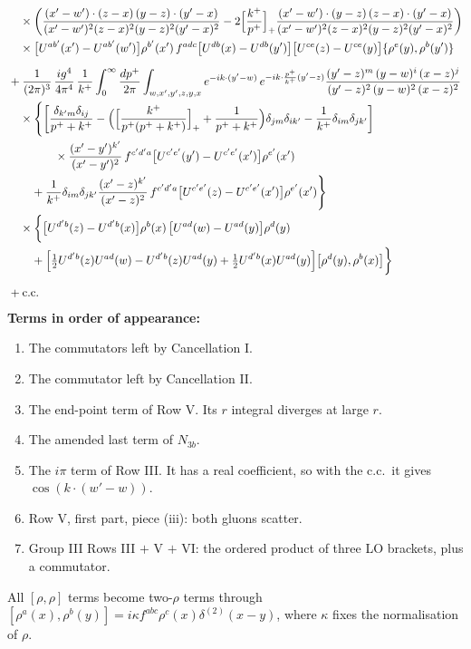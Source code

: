 \documentclass[9pt]{article}
\numberwithin{equation}{section}
\begin{document}
\begin{align}
&\quad\times\bigg(\frac{(x'-w')\cdot(z-x)\,(y-z)\cdot(y'-x)}{(x'-w')^{2}(z-x)^{2}(y-z)^{2}(y'-x)^{2}}-2\Big[\frac{k^{+}}{p^{+}}\Big]_{+}\frac{(x'-w')\cdot(y-z)\,(z-x)\cdot(y'-x)}{(x'-w')^{2}(z-x)^{2}(y-z)^{2}(y'-x)^{2}}\bigg)\notag\\
&\quad\times\big[U^{ab'}(x')-U^{ab'}(w')\big]\rho^{b'}(x')\,f^{adc}\big[U^{db}(x)-U^{db}(y')\big]\big[U^{ce}(z)-U^{ce}(y)\big]\{\rho^{e}(y),\rho^{b}(y')\}\notag\\[6pt]
&+\frac{1}{(2\pi)^{3}}\,\frac{ig^{4}}{4\pi^{4}}\,\frac{1}{k^{+}}\int_{0}^{\infty}\frac{dp^{+}}{2\pi}\int_{w,x',y',z,y,x}e^{-ik\cdot(y'-w)}\,e^{-ik\cdot\frac{p^{+}}{k^{+}}(y'-z)}\frac{(y'-z)^{m}\,(y-w)^{i}\,(x-z)^{j}}{(y'-z)^{2}\,(y-w)^{2}\,(x-z)^{2}}\notag\\
&\quad\times\Bigg\{\bigg[\frac{\delta_{k'm}\delta_{ij}}{p^{+}+k^{+}}-\Big(\Big[\frac{k^{+}}{p^{+}(p^{+}+k^{+})}\Big]_{+}+\frac{1}{p^{+}+k^{+}}\Big)\delta_{jm}\delta_{ik'}-\frac{1}{k^{+}}\delta_{im}\delta_{jk'}\bigg]\notag\\
&\qquad\qquad\times\frac{(x'-y')^{k'}}{(x'-y')^{2}}\,f^{c'd'a}\big[U^{c'e'}(y')-U^{c'e'}(x')\big]\rho^{e'}(x')\notag\\
&\qquad+\frac{1}{k^{+}}\delta_{im}\delta_{jk'}\frac{(x'-z)^{k'}}{(x'-z)^{2}}\,f^{c'd'a}\big[U^{c'e'}(z)-U^{c'e'}(x')\big]\rho^{e'}(x')\Bigg\}\notag\\
&\quad\times\bigg\{\big[U^{d'b}(z)-U^{d'b}(x)\big]\rho^{b}(x)\,\big[U^{ad}(w)-U^{ad}(y)\big]\rho^{d}(y)\notag\\
&\qquad+\Big[\tfrac12U^{d'b}(z)U^{ad}(w)-U^{d'b}(z)U^{ad}(y)+\tfrac12U^{d'b}(x)U^{ad}(y)\Big]\big[\rho^{d}(y),\rho^{b}(x)\big]\bigg\}\notag\\[6pt]
&+{\rm c.c.}
\end{align}
\textbf{Terms in order of appearance:}
\begin{enumerate}
\item The commutators left by Cancellation I.
\item The commutator left by Cancellation II.
\item The end-point term of Row V. Its $r$ integral diverges at large $r$.
\item The amended last term of $N_{3b}$.
\item The $i\pi$ term of Row III. It has a real coefficient, so with the c.c.\ it gives $\cos(k\cdot(w'-w))$.
\item Row V, first part, piece (iii): both gluons scatter.
\item Group III Rows III $+$ V $+$ VI: the ordered product of three LO brackets, plus a commutator.
\end{enumerate}
All $[\rho,\rho]$ terms become two-$\rho$ terms through $[\rho^{a}(x),\rho^{b}(y)]=i\kappa f^{abc}\rho^{c}(x)\delta^{(2)}(x-y)$, where $\kappa$ fixes the normalisation of $\rho$.
\end{document}
